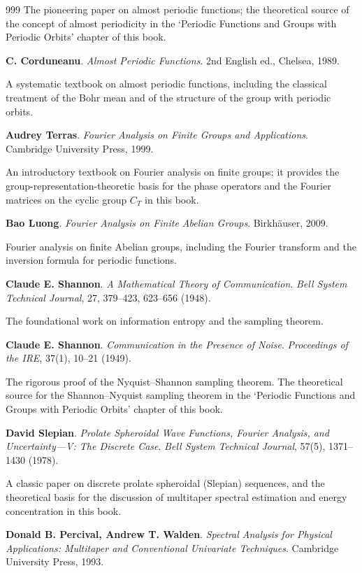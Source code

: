 \begin{thebibliography}{999}
The pioneering paper on almost periodic functions; the theoretical source of the concept of almost periodicity in the `Periodic Functions and Groups with Periodic Orbits' chapter of this book.

 \textbf{C. Corduneanu}. \textit{Almost Periodic Functions}. 2nd English ed., Chelsea, 1989.

A systematic textbook on almost periodic functions, including the classical treatment of the Bohr mean and of the structure of the group with periodic orbits.

 \textbf{Audrey Terras}. \textit{Fourier Analysis on Finite Groups and Applications}. Cambridge University Press, 1999.

An introductory textbook on Fourier analysis on finite groups; it provides the group-representation-theoretic basis for the phase operators and the Fourier matrices on the cyclic group $C_T$ in this book.

 \textbf{Bao Luong}. \textit{Fourier Analysis on Finite Abelian Groups}. Birkh\"auser, 2009.

Fourier analysis on finite Abelian groups, including the Fourier transform and the inversion formula for periodic functions.

 \textbf{Claude E. Shannon}. \textit{A Mathematical Theory of Communication}. \textit{Bell System Technical Journal}, 27, 379--423, 623--656 (1948).

The foundational work on information entropy and the sampling theorem.

 \textbf{Claude E. Shannon}. \textit{Communication in the Presence of Noise}. \textit{Proceedings of the IRE}, 37(1), 10--21 (1949).

The rigorous proof of the Nyquist--Shannon sampling theorem. The theoretical source for the Shannon--Nyquist sampling theorem in the `Periodic Functions and Groups with Periodic Orbits' chapter of this book.

 \textbf{David Slepian}. \textit{Prolate Spheroidal Wave Functions, Fourier Analysis, and Uncertainty---V: The Discrete Case}. \textit{Bell System Technical Journal}, 57(5), 1371--1430 (1978).

A classic paper on discrete prolate spheroidal (Slepian) sequences, and the theoretical basis for the discussion of multitaper spectral estimation and energy concentration in this book.

 \textbf{Donald B. Percival, Andrew T. Walden}. \textit{Spectral Analysis for Physical Applications: Multitaper and Conventional Univariate Techniques}. Cambridge University Press, 1993.


\end{thebibliography}
